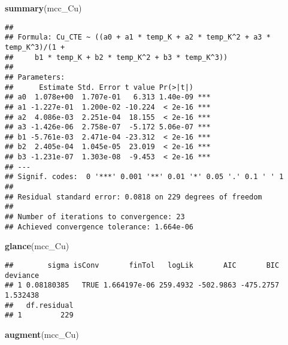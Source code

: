 \documentclass[]{book}
\newenvironment{Shaded}{\begin{snugshade}}{\end{snugshade}}
\newcommand{\KeywordTok}[1]{\textcolor[rgb]{0.13,0.29,0.53}{\textbf{#1}}}
\newcommand{\NormalTok}[1]{#1}
\theoremstyle{definition}
\theoremstyle{definition}
\theoremstyle{definition}
\theoremstyle{remark}
\begin{document}
\begin{Shaded}
\begin{Highlighting}[]
\KeywordTok{summary}\NormalTok{(mcc_Cu)}
\end{Highlighting}
\end{Shaded}

\begin{verbatim}
## 
## Formula: Cu_CTE ~ ((a0 + a1 * temp_K + a2 * temp_K^2 + a3 * temp_K^3)/(1 + 
##     b1 * temp_K + b2 * temp_K^2 + b3 * temp_K^3))
## 
## Parameters:
##      Estimate Std. Error t value Pr(>|t|)    
## a0  1.078e+00  1.707e-01   6.313 1.40e-09 ***
## a1 -1.227e-01  1.200e-02 -10.224  < 2e-16 ***
## a2  4.086e-03  2.251e-04  18.155  < 2e-16 ***
## a3 -1.426e-06  2.758e-07  -5.172 5.06e-07 ***
## b1 -5.761e-03  2.471e-04 -23.312  < 2e-16 ***
## b2  2.405e-04  1.045e-05  23.019  < 2e-16 ***
## b3 -1.231e-07  1.303e-08  -9.453  < 2e-16 ***
## ---
## Signif. codes:  0 '***' 0.001 '**' 0.01 '*' 0.05 '.' 0.1 ' ' 1
## 
## Residual standard error: 0.0818 on 229 degrees of freedom
## 
## Number of iterations to convergence: 23 
## Achieved convergence tolerance: 1.664e-06
\end{verbatim}

\begin{Shaded}
\begin{Highlighting}[]
\KeywordTok{glance}\NormalTok{(mcc_Cu)}
\end{Highlighting}
\end{Shaded}

\begin{verbatim}
##        sigma isConv       finTol   logLik       AIC       BIC deviance
## 1 0.08180385   TRUE 1.664197e-06 259.4932 -502.9863 -475.2757 1.532438
##   df.residual
## 1         229
\end{verbatim}

\begin{Shaded}
\begin{Highlighting}[]
\KeywordTok{augment}\NormalTok{(mcc_Cu)}
\end{Highlighting}
\end{Shaded}
\end{document}
